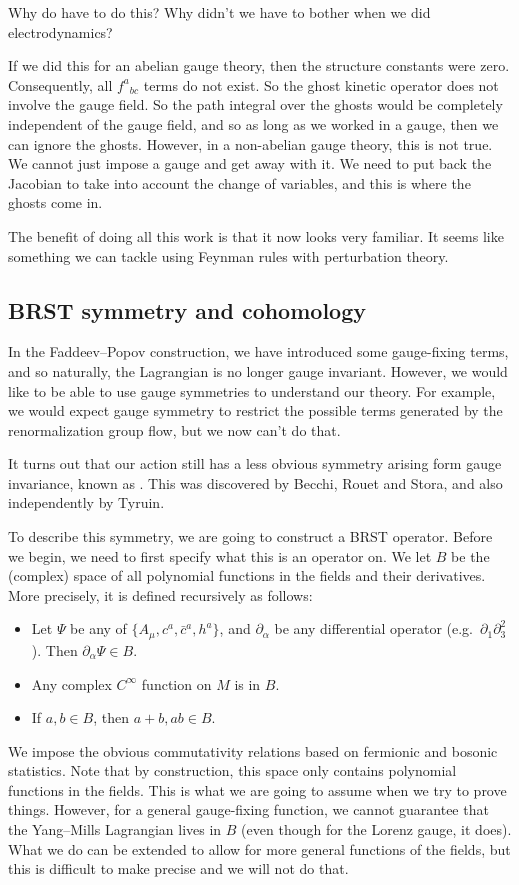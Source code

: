 \documentclass[a4paper]{article}
\begin{document}
Why do have to do this? Why didn't we have to bother when we did electrodynamics?

If we did this for an abelian gauge theory, then the structure constants were zero. Consequently, all $f^a\!_{bc}$ terms do not exist. So the ghost kinetic operator does not involve the gauge field. So the path integral over the ghosts would be completely independent of the gauge field, and so as long as we worked in a gauge, then we can ignore the ghosts. However, in a non-abelian gauge theory, this is not true. We cannot just impose a gauge and get away with it. We need to put back the Jacobian to take into account the change of variables, and this is where the ghosts come in.

The benefit of doing all this work is that it now looks very familiar. It seems like something we can tackle using Feynman rules with perturbation theory.

\subsection{BRST symmetry and cohomology}
In the Faddeev--Popov construction, we have introduced some gauge-fixing terms, and so naturally, the Lagrangian is no longer gauge invariant. However, we would like to be able to use gauge symmetries to understand our theory. For example, we would expect gauge symmetry to restrict the possible terms generated by the renormalization group flow, but we now can't do that.

It turns out that our action still has a less obvious symmetry arising form gauge invariance, known as . This was discovered by Becchi, Rouet and Stora, and also independently by Tyruin.

To describe this symmetry, we are going to construct a BRST operator. Before we begin, we need to first specify what this is an operator on. We let $B$ be the (complex) space of all polynomial functions in the fields and their derivatives. More precisely, it is defined recursively as follows:
\begin{itemize}
  \item Let $\Psi$ be any of $\{A_\mu, c^a, \bar{c}^a, h^a\}$, and $\partial_\alpha$ be any differential operator (e.g.\ $\partial_1 \partial_3^2$). Then $\partial_\alpha \Psi \in B$.
  \item Any complex $C^\infty$ function on $M$ is in $B$.
  \item If $a, b \in B$, then $a + b, ab \in B$.
\end{itemize}
We impose the obvious commutativity relations based on fermionic and bosonic statistics. Note that by construction, this space only contains polynomial functions in the fields. This is what we are going to assume when we try to prove things. However, for a general gauge-fixing function, we cannot guarantee that the Yang--Mills Lagrangian lives in $B$ (even though for the Lorenz gauge, it does). What we do can be extended to allow for more general functions of the fields, but this is difficult to make precise and we will not do that.
\end{document}
